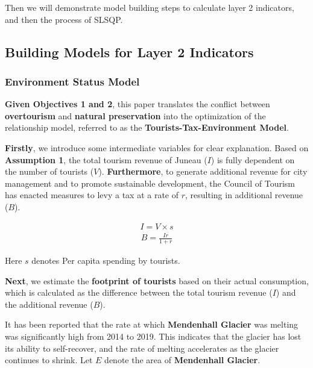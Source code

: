 \documentclass[UTF8]{mcmthesis}
\begin{document}
    Then we will demonstrate model building steps to calculate layer 2 indicators, and then the process of SLSQP.
    
    \subsection{Building Models for Layer 2 Indicators}
    \subsubsection{Environment Status Model}
    
    \hspace*{2em} \textbf{Given Objectives 1 and 2}, this paper translates the conflict between \textbf{overtourism} and \textbf{natural preservation} into the optimization of the relationship model, referred to as the \textbf{Tourists-Tax-Environment Model}.
    
    \textbf{Firstly}, we introduce some intermediate variables for clear explanation. Based on \textbf{Assumption 1}, the total tourism revenue of Juneau (\(I\)) is fully dependent on the number of tourists (\(V\)). \textbf{Furthermore}, to generate additional revenue for city management and to promote sustainable development, the Council of Tourism has enacted measures to levy a tax at a rate of $r$, resulting in additional revenue (\(B\)).
    

    \begin{equation}
        \begin{aligned}
        {I} = {V}  \times {s}
        \end{aligned}
        \end{equation}
        \begin{equation}
            \begin{aligned}
{B} = \frac{I r}{1+r}
            \end{aligned}
            \end{equation}

        Here $s$ denotes Per capita spending by tourists.
        
        \hspace*{2em} \textbf{Next}, we estimate the \textbf{footprint of tourists} based on their actual consumption, which is calculated as the difference between the total tourism revenue (\(I\)) and the additional revenue (\(B\)). 

        It has been reported that the rate at which \textbf{Mendenhall Glacier} was melting was significantly high from 2014 to 2019. This indicates that the glacier has lost its ability to self-recover, and the rate of melting accelerates as the glacier continues to shrink. Let \(E\) denote the area of \textbf{Mendenhall Glacier}.
        
\end{document}
